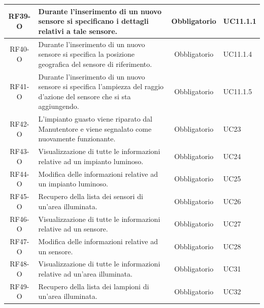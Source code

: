 \documentclass[a4paper, 12pt]{article}
\begin{document}
\begin{longtable}{|c|p{7cm}|c|p{4cm}|}
    \hline
    RF39-O          & Durante l'inserimento di un nuovo sensore si specificano i dettagli relativi a tale sensore.                                                                  & Obbligatorio       & UC11.1.1       \\
    \hline
    RF40-O          & Durante l'inserimento di un nuovo sensore si specifica la posizione geografica del sensore di riferimento.                                                    & Obbligatorio       & UC11.1.4       \\
    \hline
    RF41-O          & Durante l'inserimento di un nuovo sensore si specifica l'ampiezza del raggio d'azione del sensore che si sta aggiungendo.                                     & Obbligatorio       & UC11.1.5       \\
    \hline
    RF42-O          & L'impianto guasto viene riparato dal Manutentore e viene segnalato come nuovamente funzionante.                                                               & Obbligatorio       & UC23           \\
    \hline
    RF43-O          & Visualizzazione di tutte le informazioni relative ad un impianto luminoso.                                                                                    & Obbligatorio       & UC24           \\
    \hline
    RF44-O          & Modifica delle informazioni relative ad un impianto luminoso.                                                                                                 & Obbligatorio       & UC25           \\
    \hline
    RF45-O          & Recupero della lista dei sensori di un'area illuminata.                                                                                                       & Obbligatorio       & UC26           \\
    \hline
    RF46-O          & Visualizzazione di tutte le informazioni relative ad un sensore.                                                                                              & Obbligatorio       & UC27           \\
    \hline
    RF47-O          & Modifica delle informazioni relative ad un sensore.                                                                                                           & Obbligatorio       & UC28           \\
    \hline
    RF48-O          & Visualizzazione di tutte le informazioni relative ad un'area illuminata.                                                                                      & Obbligatorio       & UC31           \\
    \hline
    RF49-O          & Recupero della lista dei lampioni di un'area illuminata.                                                                                                      & Obbligatorio       & UC32           \\





    \bottomrule
\end{longtable}
\end{document}
